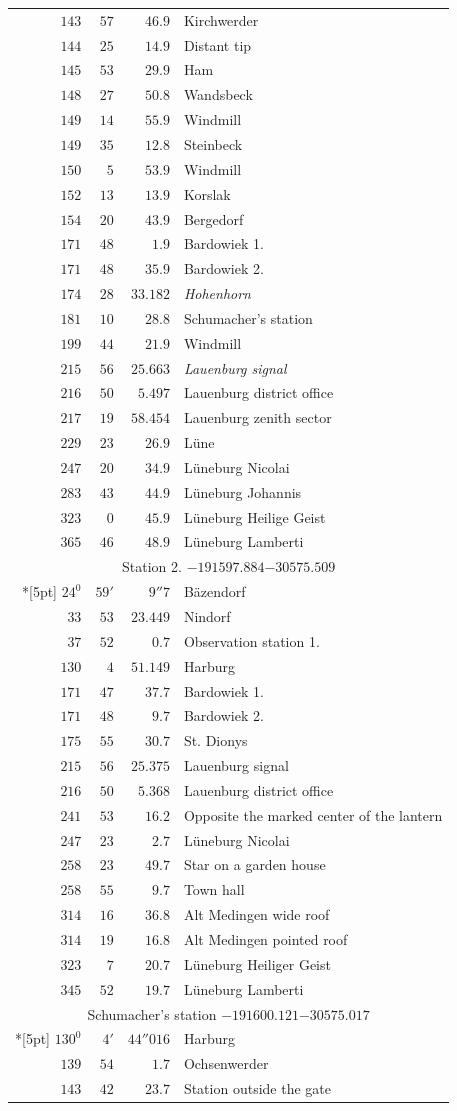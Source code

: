 \begin{longtable}{@{}rrrp{.61\linewidth}@{}}
\(143\)&\(57\)&\(46.9\)&\raggedright Kirchwerder\tabularnewline
\(144\)&\(25\)&\(14.9\)&\raggedright Distant tip\tabularnewline
\(145\)&\(53\)&\(29.9\)&\raggedright Ham\tabularnewline
\(148\)&\(27\)&\(50.8\)&\raggedright Wandsbeck\tabularnewline
\(149\)&\(14\)&\(55.9\)&\raggedright Windmill\tabularnewline
\(149\)&\(35\)&\(12.8\)&\raggedright Steinbeck\tabularnewline
\(150\)&\(5\)&\(53.9\)&\raggedright Windmill\tabularnewline
\(152\)&\(13\)&\(13.9\)&\raggedright Korslak\tabularnewline
\(154\)&\(20\)&\(43.9\)&\raggedright Bergedorf\tabularnewline
\(171\)&\(48\)&\(1.9\)&\raggedright Bardowiek 1.\tabularnewline
\(171\)&\(48\)&\(35.9\)&\raggedright Bardowiek 2.\tabularnewline
\(174\)&\(28\)&\(33.182\)&\raggedright \textit{Hohenhorn}\tabularnewline
\(181\)&\(10\)&\(28.8\)&\raggedright Schumacher’s station\tabularnewline
\(199\)&\(44\)&\(21.9\)&\raggedright Windmill\tabularnewline
\(215\)&\(56\)&\(25.663\)&\raggedright \textit{Lauenburg signal}\tabularnewline
\(216\)&\(50\)&\(5.497\)&\raggedright Lauenburg district office\tabularnewline
\(217\)&\(19\)&\(58.454\)&\raggedright Lauenburg zenith sector\tabularnewline
\(229\)&\(23\)&\(26.9\)&\raggedright Lüne\tabularnewline
\(247\)&\(20\)&\(34.9\)&\raggedright Lüneburg Nicolai\tabularnewline
\(283\)&\(43\)&\(44.9\)&\raggedright Lüneburg Johannis\tabularnewline
\(323\)&\(0\)&\(45.9\)&\raggedright Lüneburg Heilige Geist\tabularnewline
\(365\)&\(46\)&\(48.9\)&\raggedright Lüneburg Lamberti\tabularnewline
\multicolumn{4}{c}{Station 2. \(-191597.884\)\qquad\(-30575.509\)}\\*[5pt]
\(24^{0}\)&\(59'\)&\(9''7\)&\raggedright Bäzendorf\tabularnewline
\(33\)&\(53\)&\(23.449\)&\raggedright Nindorf\tabularnewline
\(37\)&\(52\)&\(0.7\)&\raggedright Observation station 1.\tabularnewline
\(130\)&\(4\)&\(51.149\)&\raggedright Harburg\tabularnewline
\(171\)&\(47\)&\(37.7\)&\raggedright Bardowiek 1.\tabularnewline
\(171\)&\(48\)&\(9.7\)&\raggedright Bardowiek 2.\tabularnewline
\(175\)&\(55\)&\(30.7\)&\raggedright St. Dionys\tabularnewline
\(215\)&\(56\)&\(25.375\)&\raggedright Lauenburg signal\tabularnewline
\(216\)&\(50\)&\(5.368\)&\raggedright Lauenburg district office\tabularnewline
\(241\)&\(53\)&\(16.2\)&\raggedright Opposite the marked center of the lantern\tabularnewline
\(247\)&\(23\)&\(2.7\)&\raggedright Lüneburg Nicolai\tabularnewline
\(258\)&\(23\)&\(49.7\)&\raggedright Star on a garden house\tabularnewline
\(258\)&\(55\)&\(9.7\)&\raggedright Town hall\tabularnewline
\(314\)&\(16\)&\(36.8\)&\raggedright Alt Medingen wide roof\tabularnewline
\(314\)&\(19\)&\(16.8\)&\raggedright Alt Medingen pointed roof\tabularnewline
\(323\)&\(7\)&\(20.7\)&\raggedright Lüneburg Heiliger Geist\tabularnewline
\(345\)&\(52\)&\(19.7\)&\raggedright Lüneburg Lamberti\tabularnewline
\multicolumn{4}{c}{Schumacher’s station \(-191600.121\)\qquad\(-30575.017\)}\\*[5pt]
\(130^{0}\)&\(4'\)&\(44''016\)&\raggedright Harburg\tabularnewline
\(139\)&\(54\)&\(1.7\)&\raggedright Ochsenwerder\tabularnewline
\(143\)&\(42\)&\(23.7\)&\raggedright Station outside the gate\tabularnewline
\end{longtable}
\endgroup
